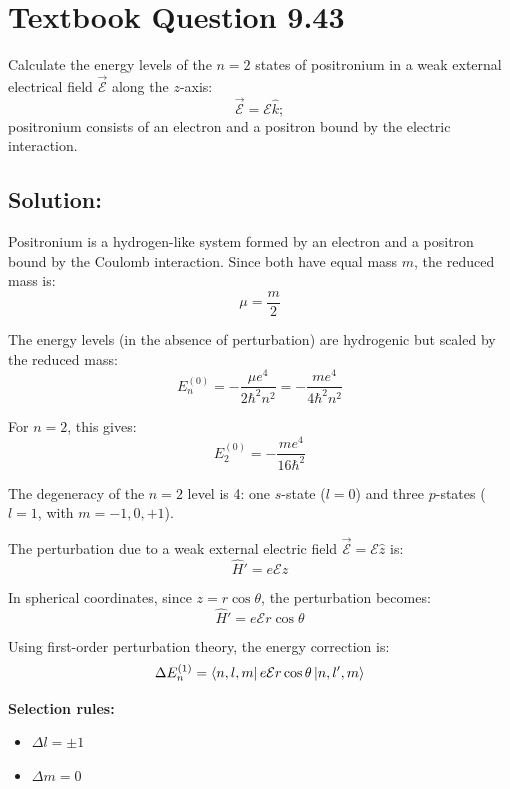 \documentclass[12pt]{article}
\begin{document}
\section{Textbook Question 9.43}
        Calculate the energy levels of the \( n = 2 \) states of positronium in a weak external electrical field \( \vec{\mathcal{E}} \) along the \( z \)-axis: 
        \[
        \vec{\mathcal{E}} = \mathcal{E} \hat{k};
        \]
        positronium consists of an electron and a positron bound by the electric interaction.

    \subsection{Solution:}
        Positronium is a hydrogen-like system formed by an electron and a positron bound by the Coulomb interaction. Since both have equal mass \( m \), the reduced mass is:
        \[
            \mu = \frac{m}{2}
        \]
        
        The energy levels (in the absence of perturbation) are hydrogenic but scaled by the reduced mass:
        \[
            E_n^{(0)} = -\frac{\mu e^4}{2\hbar^2 n^2} = -\frac{m e^4}{4 \hbar^2 n^2}
        \]
        
        For \( n = 2 \), this gives:
        \[
            E_2^{(0)} = -\frac{m e^4}{16 \hbar^2}
        \]
        
        The degeneracy of the \( n = 2 \) level is 4: one \( s \)-state (\( l = 0 \)) and three \( p \)-states (\( l = 1 \), with \( m = -1, 0, +1 \)).
        
        The perturbation due to a weak external electric field \( \vec{\mathcal{E}} = \mathcal{E} \hat{z} \) is:
        \[
            \hat{H}' = e \mathcal{E} z
        \]
        
        In spherical coordinates, since \( z = r \cos\theta \), the perturbation becomes:
        \[
            \hat{H}' = e \mathcal{E} r \cos\theta
        \]
        
        Using first-order perturbation theory, the energy correction is:
        \[
            \Delta E_n^{(1)} = \bra{n, l, m} e \mathcal{E} r \cos\theta \ket{n, l', m}
        \]
        
        \textbf{Selection rules:}
        \begin{itemize}
            \item \( \Delta l = \pm 1 \)
            \item \( \Delta m = 0 \)
        \end{itemize}
        
\end{document}

